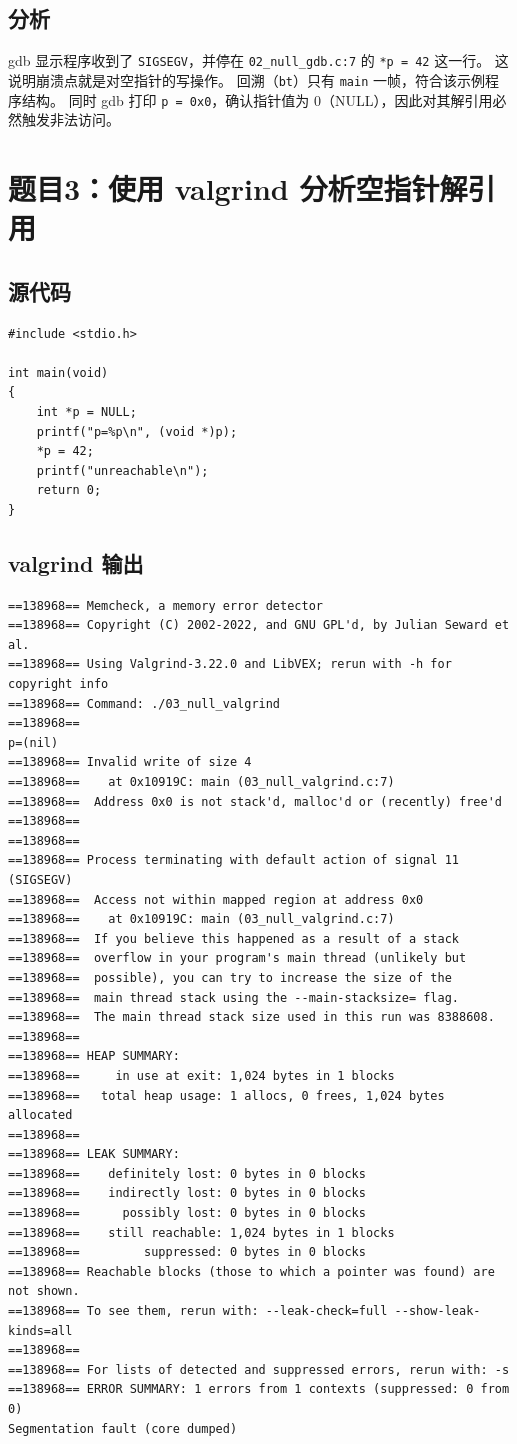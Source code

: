 \documentclass[fleqn]{ctexart}
\begin{document}
\subsection*{分析}
gdb 显示程序收到了 \verb|SIGSEGV|，并停在 \verb|02_null_gdb.c:7| 的 \verb|*p = 42| 这一行。
这说明崩溃点就是对空指针的写操作。
回溯（\verb|bt|）只有 \verb|main| 一帧，符合该示例程序结构。
同时 gdb 打印 \verb|p = 0x0|，确认指针值为 0（NULL），因此对其解引用必然触发非法访问。


\section*{题目3：使用 valgrind 分析空指针解引用}
\subsection*{源代码}
\begin{verbatim}
#include <stdio.h>

int main(void)
{
	int *p = NULL;
	printf("p=%p\n", (void *)p);
	*p = 42;
	printf("unreachable\n");
	return 0;
}
\end{verbatim}

\subsection*{valgrind 输出}
\begin{verbatim}
==138968== Memcheck, a memory error detector
==138968== Copyright (C) 2002-2022, and GNU GPL'd, by Julian Seward et al.
==138968== Using Valgrind-3.22.0 and LibVEX; rerun with -h for copyright info
==138968== Command: ./03_null_valgrind
==138968== 
p=(nil)
==138968== Invalid write of size 4
==138968==    at 0x10919C: main (03_null_valgrind.c:7)
==138968==  Address 0x0 is not stack'd, malloc'd or (recently) free'd
==138968== 
==138968== 
==138968== Process terminating with default action of signal 11 (SIGSEGV)
==138968==  Access not within mapped region at address 0x0
==138968==    at 0x10919C: main (03_null_valgrind.c:7)
==138968==  If you believe this happened as a result of a stack
==138968==  overflow in your program's main thread (unlikely but
==138968==  possible), you can try to increase the size of the
==138968==  main thread stack using the --main-stacksize= flag.
==138968==  The main thread stack size used in this run was 8388608.
==138968== 
==138968== HEAP SUMMARY:
==138968==     in use at exit: 1,024 bytes in 1 blocks
==138968==   total heap usage: 1 allocs, 0 frees, 1,024 bytes allocated
==138968== 
==138968== LEAK SUMMARY:
==138968==    definitely lost: 0 bytes in 0 blocks
==138968==    indirectly lost: 0 bytes in 0 blocks
==138968==      possibly lost: 0 bytes in 0 blocks
==138968==    still reachable: 1,024 bytes in 1 blocks
==138968==         suppressed: 0 bytes in 0 blocks
==138968== Reachable blocks (those to which a pointer was found) are not shown.
==138968== To see them, rerun with: --leak-check=full --show-leak-kinds=all
==138968== 
==138968== For lists of detected and suppressed errors, rerun with: -s
==138968== ERROR SUMMARY: 1 errors from 1 contexts (suppressed: 0 from 0)
Segmentation fault (core dumped)
\end{verbatim}
\end{document}
